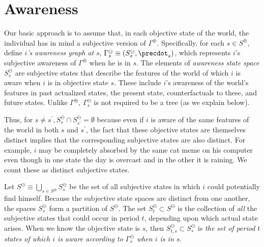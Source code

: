\documentclass[
11pt,
titlepage,
reqno,
]{article}%
\theoremstyle{definition}
\begin{document}
\section{Awareness}
Our basic approach is to assume that, in each objective state of the world, the individual has in mind a subjective version of $\Gamma^\oplus$. 
Specifically, for each $s\in S^\oplus$, define \textit{$i$'s awareness graph at $s$}, $\Gamma^\ominus_s\equiv(S^\ominus_s,\precdot_s)$, which represents $i$'s subjective awareness of $\Gamma^\oplus$ when he is in $s$.
The elements of \textit{awareness state space} $S^\ominus_s$ are subjective states that describe the features of the world of which $i$ is aware when $i$ is in objective state $s$.
These include $i$'s awareness of the world's features in past actualized states, the present state, counterfactuals to these, and future states.
Unlike $\Gamma^\oplus$, $\Gamma^\ominus_s$ is not required to be a tree (as we explain below).

Thus, for $s\ne s^\prime,S^\ominus_s\cap S^\ominus_{s^\prime}=\emptyset$ because even if $i$ is aware of the same features of the world in both $s$ and $s^\prime$, the fact that these objective states are themselves distinct implies that the corresponding subjective states are also distinct.
For example, $i$ may be completely absorbed by the same cat meme on his computer even though in one state the day is overcast and in the other it is raining. 
We count these as distinct subjective states.

Let $S^\ominus\equiv \bigcup_{s\in S^\oplus}S^\ominus_s$ be the set of all subjective states in which $i$ could potentially find himself.
Because the subjective state spaces are distinct from one another, the spaces $S^\ominus_s$ form a partition of $S^\ominus$.
The set $S^\ominus_t\subset S^\ominus$ is the collection of \textit{all} the subjective states that could occur in period $t$, depending upon which actual state arises.
When we know the objective state is $s$, then $S^\ominus_{t,s}\subset S^\ominus_s$ is \textit{the set of period $t$ states of which $i$ is aware according to $\Gamma^\ominus_s$ when $i$ is in $s$}.
\end{document}
